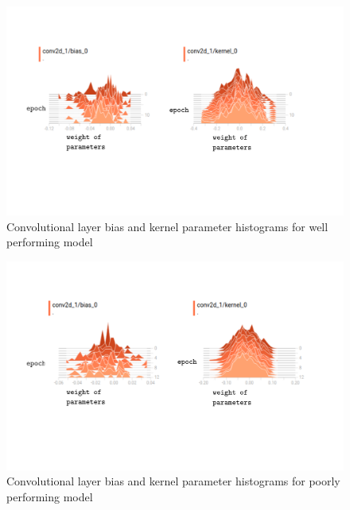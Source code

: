 \documentclass{article}
\begin{document}
\begin{figure}[h]
  \includegraphics[width=\linewidth]{goodearlyweights.pdf}
  \caption{Convolutional layer bias and kernel parameter histograms for well performing model}
  \label{fig:goodearlyweights}
\end{figure}

\begin{figure}[h]
  \includegraphics[width=\linewidth]{badearlyweights.pdf}
  \caption{Convolutional layer bias and kernel parameter histograms for poorly performing model}
  \label{fig:badearlyweights}
\end{figure}
\end{document}

